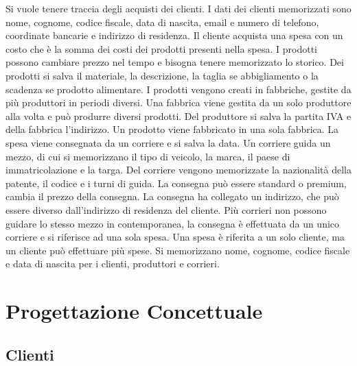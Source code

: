 \documentclass[a4paper,12pt]{report}
\begin{document}
Si vuole tenere traccia degli acquisti dei clienti. I dati dei clienti memorizzati sono nome, cognome, codice fiscale, data di nascita, 
email e numero di telefono, coordinate bancarie e indirizzo di residenza.
Il cliente acquista una spesa con un costo che è la somma dei costi dei prodotti presenti nella spesa. 
I prodotti possono cambiare prezzo nel tempo e bisogna tenere memorizzato lo storico. 
Dei prodotti si salva il materiale, la descrizione, la taglia se abbigliamento o la scadenza se prodotto alimentare. 
I prodotti vengono creati in fabbriche, gestite da più produttori in periodi diversi. Una fabbrica viene gestita da un solo produttore alla volta e può produrre diversi prodotti. 
Del produttore si salva la partita IVA e della fabbrica l'indirizzo. Un prodotto viene fabbricato in una sola fabbrica.
La spesa viene consegnata da un corriere e si salva la data. Un corriere guida un mezzo, di cui si memorizzano il tipo di veicolo, la marca, il paese di immatricolazione e la targa.
Del corriere vengono memorizzate la nazionalità della patente, il codice e i turni di guida. La consegna può essere standard o premium, cambia il prezzo della consegna.
La consegna ha collegato un indirizzo, che può essere diverso dall'indirizzo di residenza del cliente. Più corrieri non possono guidare lo stesso mezzo in contemporanea, la consegna è effettuata da un unico corriere 
e si riferisce ad una sola spesa. Una spesa è riferita a un solo cliente, ma un cliente può effettuare più spese. 
Si memorizzano nome, cognome, codice fiscale e data di nascita per i clienti, produttori e corrieri.

\chapter{Progettazione Concettuale}
\section{Clienti}
\end{document}
